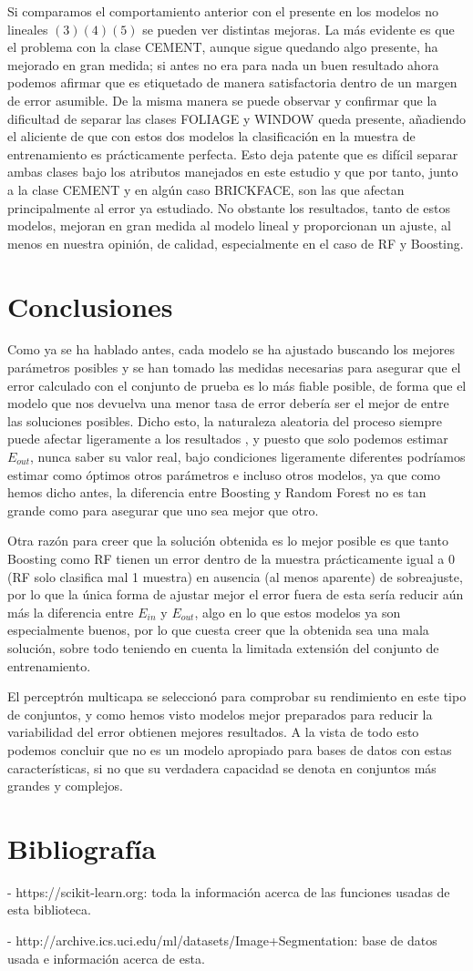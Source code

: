 \documentclass{article}
\begin{document}
	Si comparamos el comportamiento anterior con el presente en los modelos no lineales $(3)(4)(5)$ se pueden ver distintas mejoras. La más evidente es que el problema con la clase CEMENT, aunque sigue quedando algo presente, ha mejorado en gran medida; si antes no era para nada un buen resultado ahora podemos afirmar que es etiquetado de manera satisfactoria dentro de un margen de error asumible. De la misma manera se puede observar y confirmar que la dificultad de separar las clases FOLIAGE y WINDOW queda presente, añadiendo el aliciente de que con estos dos modelos la clasificación en la muestra de entrenamiento es prácticamente perfecta. Esto deja patente que es difícil separar ambas clases bajo los atributos manejados en este estudio y que por tanto, junto a la clase CEMENT y en algún caso BRICKFACE, son las que afectan principalmente al error ya estudiado. No obstante los resultados, tanto de estos modelos, mejoran en gran medida al modelo lineal y proporcionan un ajuste, al menos en nuestra opinión, de calidad, especialmente en el caso de RF y Boosting.
	
	\section{Conclusiones}
	Como ya se ha hablado antes, cada modelo se ha ajustado buscando los mejores parámetros posibles y se han tomado las medidas necesarias para asegurar que el error calculado con el conjunto de prueba es lo más fiable posible, de forma que el modelo que nos devuelva una menor tasa de error debería ser el mejor de entre las soluciones posibles. Dicho esto, la naturaleza aleatoria del proceso siempre puede afectar ligeramente a los resultados , y puesto que solo podemos estimar $E_{out}$, nunca saber su valor real, bajo condiciones ligeramente diferentes podríamos estimar como óptimos otros parámetros e incluso otros modelos, ya que como hemos dicho antes, la diferencia entre Boosting y Random Forest no es tan grande como para asegurar que uno sea mejor que otro.
	\par 
	Otra razón para creer que la solución obtenida es lo mejor posible es que tanto Boosting como RF tienen un error dentro de la muestra prácticamente igual a 0 (RF solo clasifica mal 1 muestra) en ausencia (al menos aparente) de sobreajuste, por lo que la única forma de ajustar mejor el error fuera de esta sería reducir aún más la diferencia entre $E_{in}$ y $E_{out}$, algo en lo que estos modelos ya son especialmente buenos, por lo que cuesta creer que la obtenida sea una mala solución, sobre todo teniendo en cuenta la limitada extensión del conjunto de entrenamiento.
	\par
	 El perceptrón multicapa se seleccionó para comprobar su rendimiento en este tipo de conjuntos, y como hemos visto modelos mejor preparados para reducir la variabilidad del error obtienen mejores resultados. A la vista de todo esto podemos concluir que no es un modelo apropiado para bases de datos con estas características, si no que su verdadera capacidad se denota en conjuntos más grandes y complejos.
	\section{Bibliografía}
	- https://scikit-learn.org: toda la información acerca de las funciones usadas de esta biblioteca.\par
	- http://archive.ics.uci.edu/ml/datasets/Image+Segmentation: base de datos usada e información acerca de esta.
	
	
\end{document}
